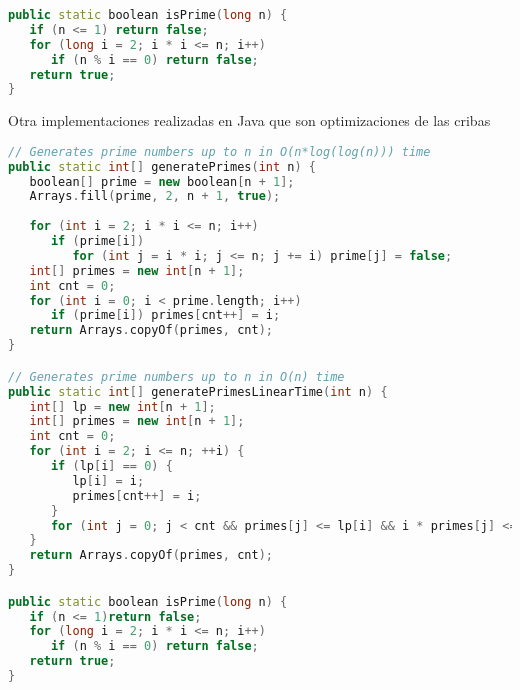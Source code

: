 \begin{lstlisting}[language=C++]
public static boolean isPrime(long n) {
   if (n <= 1) return false;
   for (long i = 2; i * i <= n; i++)
      if (n % i == 0) return false;
   return true;
}
\end{lstlisting} 



Otra implementaciones realizadas en Java que son optimizaciones de las cribas
\begin{lstlisting}[language=C++]
// Generates prime numbers up to n in O(n*log(log(n))) time
public static int[] generatePrimes(int n) {
   boolean[] prime = new boolean[n + 1];
   Arrays.fill(prime, 2, n + 1, true);
	
   for (int i = 2; i * i <= n; i++)
      if (prime[i])
         for (int j = i * i; j <= n; j += i) prime[j] = false;
   int[] primes = new int[n + 1];
   int cnt = 0;
   for (int i = 0; i < prime.length; i++)
      if (prime[i]) primes[cnt++] = i;
   return Arrays.copyOf(primes, cnt);
}

// Generates prime numbers up to n in O(n) time
public static int[] generatePrimesLinearTime(int n) {
   int[] lp = new int[n + 1];
   int[] primes = new int[n + 1];
   int cnt = 0;
   for (int i = 2; i <= n; ++i) {
      if (lp[i] == 0) {
         lp[i] = i;
         primes[cnt++] = i;
      }
      for (int j = 0; j < cnt && primes[j] <= lp[i] && i * primes[j] <= n; ++j) lp[i * primes[j]] = primes[j];
   }
   return Arrays.copyOf(primes, cnt);
}

public static boolean isPrime(long n) {
   if (n <= 1)return false;
   for (long i = 2; i * i <= n; i++)
      if (n % i == 0) return false;
   return true;
}
\end{lstlisting}


